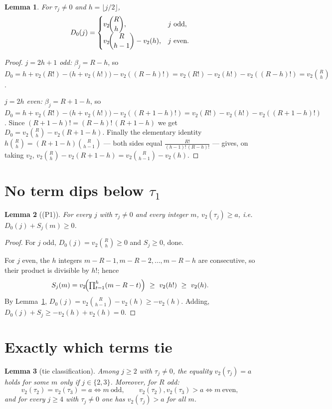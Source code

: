 \documentclass[11pt]{article}
\newtheorem{lemma}{Lemma}
\theoremstyle{definition}
\newcommand{\vtwo}{v_2}
\begin{document}
\begin{lemma}\label{lem:D0}
For $\tau_j\neq 0$ and $h=\lfloor j/2\rfloor$,
\[
   D_0(j)=
   \begin{cases}
     \vtwo\!\dbinom{R}{h}, & j\ \text{odd},\\[1.2ex]
     \vtwo\!\dbinom{R}{h-1}-\vtwo(h), & j\ \text{even}.
   \end{cases}
\]
\end{lemma}

\begin{proof}
\emph{$j=2h+1$ odd:} $\beta_j=R-h$, so
$D_0=h+\vtwo(R!)-\bigl(h+\vtwo(h!)\bigr)-\vtwo((R-h)!)
=\vtwo(R!)-\vtwo(h!)-\vtwo((R-h)!)=\vtwo\binom{R}{h}$.

\emph{$j=2h$ even:} $\beta_j=R+1-h$, so
$D_0=h+\vtwo(R!)-\bigl(h+\vtwo(h!)\bigr)-\vtwo((R+1-h)!)
=\vtwo(R!)-\vtwo(h!)-\vtwo((R+1-h)!)$.
Since $(R+1-h)!=(R-h)!\,(R+1-h)$ we get
$D_0=\vtwo\binom{R}{h}-\vtwo(R+1-h)$. Finally the elementary identity
$h\binom{R}{h}=(R+1-h)\binom{R}{h-1}$ --- both sides equal
$\tfrac{R!}{(h-1)!\,(R-h)!}$ --- gives, on taking $\vtwo$,
$\vtwo\binom{R}{h}-\vtwo(R+1-h)=\vtwo\binom{R}{h-1}-\vtwo(h)$.
\end{proof}

\section{No term dips below $\tau_1$}

\begin{lemma}[(P1)]\label{lem:P1}
For every $j$ with $\tau_j\neq0$ and every integer $m$, $\vtwo(\tau_j)\ge a$, i.e.
$D_0(j)+S_j(m)\ge 0$.
\end{lemma}

\begin{proof}
For $j$ odd, $D_0(j)=\vtwo\binom{R}{h}\ge0$ and $S_j\ge0$, done.

For $j$ even, the $h$ integers $m-R-1,m-R-2,\dots,m-R-h$ are consecutive, so their
product is divisible by $h!$; hence
\[
   S_j(m)=\vtwo\!\Bigl(\textstyle\prod_{t=1}^{h}(m-R-t)\Bigr)\ \ge\ \vtwo(h!)\ \ge\ \vtwo(h).
\]
By Lemma~\ref{lem:D0}, $D_0(j)=\vtwo\binom{R}{h-1}-\vtwo(h)\ge -\vtwo(h)$. Adding,
$D_0(j)+S_j\ge -\vtwo(h)+\vtwo(h)=0$.
\end{proof}

\section{Exactly which terms tie}

\begin{lemma}[tie classification]\label{lem:ties}
Among $j\ge 2$ with $\tau_j\neq 0$, the equality $\vtwo(\tau_j)=a$ holds for some
$m$ only if $j\in\{2,3\}$. Moreover, for $R$ odd:
\[
   \vtwo(\tau_2)=\vtwo(\tau_3)=a \iff m\ \text{odd},\qquad
   \vtwo(\tau_2),\vtwo(\tau_3)>a \iff m\ \text{even},
\]
and for every $j\ge 4$ with $\tau_j\neq 0$ one has $\vtwo(\tau_j)>a$ for all $m$.
\end{lemma}
\end{document}
